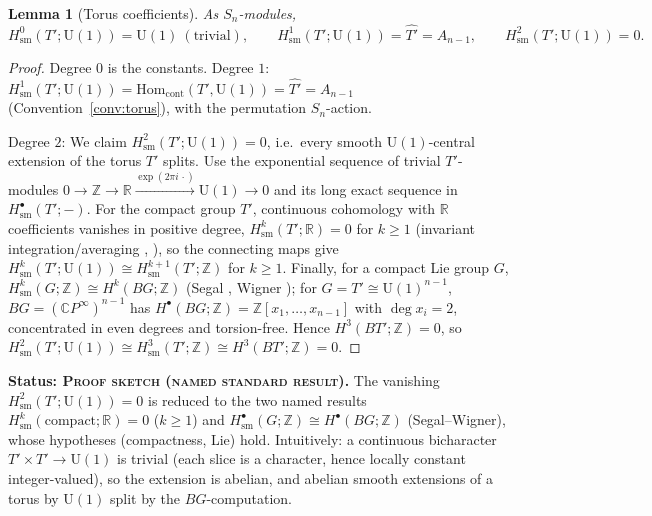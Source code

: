 \documentclass[11pt]{article}
\newtheorem{lemma}[theorem]{Lemma}
\theoremstyle{definition}
\newcommand{\U}{\mathrm{U}}
\newcommand{\Z}{\mathbb{Z}}
\newcommand{\R}{\mathbb{R}}
\newcommand{\C}{\mathbb{C}}
\newcommand{\Hom}{\mathrm{Hom}}
\newcommand{\Tp}{T'}
\newcommand{\Thatp}{\widehat{T'}}
\newcommand{\sm}{\mathrm{sm}}
\newcommand{\STAT}[1]{\noindent\textbf{Status: #1}}
\newcommand{\SKETCH}{\textsc{Proof sketch (named standard result)}}
\begin{document}
\begin{lemma}[Torus coefficients]\label{lem:toruscoh}
As $S_n$-modules,
\[
H^{0}_{\sm}(\Tp;\U(1))=\U(1)\ (\text{trivial}),\qquad
H^{1}_{\sm}(\Tp;\U(1))=\Thatp=A_{n-1},\qquad
H^{2}_{\sm}(\Tp;\U(1))=0 .
\]
\end{lemma}
\begin{proof}
Degree $0$ is the constants. Degree $1$: $H^1_{\sm}(\Tp;\U(1))=\Hom_{\mathrm{cont}}
(\Tp,\U(1))=\Thatp=A_{n-1}$ (Convention~\ref{conv:torus}), with the permutation
$S_n$-action.

Degree $2$: We claim $H^2_{\sm}(\Tp;\U(1))=0$, i.e.\ every smooth $\U(1)$-central extension
of the torus $\Tp$ splits. Use the exponential sequence of trivial $\Tp$-modules
$0\to\Z\to\R\xrightarrow{\exp(2\pi i\,\cdot)}\U(1)\to0$ and its long exact sequence in
$H^{\bullet}_{\sm}(\Tp;-)$. For the compact group $\Tp$, continuous cohomology with $\R$
coefficients vanishes in positive degree, $H^{k}_{\sm}(\Tp;\R)=0$ for $k\ge1$ (invariant
integration/averaging \cite[Ch.~IX]{BorelWallach}, \cite{MooreIII}), so the connecting maps
give $H^{k}_{\sm}(\Tp;\U(1))\cong H^{k+1}_{\sm}(\Tp;\Z)$ for $k\ge1$. Finally, for a compact
Lie group $G$, $H^{k}_{\sm}(G;\Z)\cong H^{k}(BG;\Z)$ (Segal \cite{Segal}, Wigner
\cite{Wigner}); for $G=\Tp\cong\U(1)^{n-1}$, $BG=(\C P^{\infty})^{n-1}$ has
$H^{\bullet}(BG;\Z)=\Z[x_1,\dots,x_{n-1}]$ with $\deg x_i=2$, concentrated in even degrees
and torsion-free. Hence $H^{3}(B\Tp;\Z)=0$, so
$H^{2}_{\sm}(\Tp;\U(1))\cong H^{3}_{\sm}(\Tp;\Z)\cong H^3(B\Tp;\Z)=0$.
\end{proof}
\STAT{\SKETCH.} The vanishing $H^2_{\sm}(\Tp;\U(1))=0$ is reduced to the two named results
$H^{k}_{\sm}(\mathrm{compact};\R)=0$ ($k\ge1$) and $H^{\bullet}_{\sm}(G;\Z)\cong
H^{\bullet}(BG;\Z)$ (Segal--Wigner), whose hypotheses (compactness, Lie) hold. Intuitively:
a continuous bicharacter $\Tp\times\Tp\to\U(1)$ is trivial (each slice is a character, hence
locally constant integer-valued), so the extension is abelian, and abelian smooth extensions
of a torus by $\U(1)$ split by the $BG$-computation.
\end{document}
